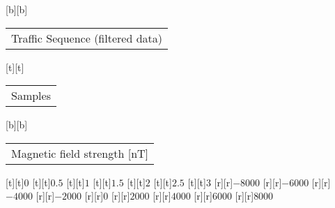 %
%
[b][b]{\fontsize{8}{12}\selectfont \setlength{\tabcolsep}{0pt}\begin{tabular}{c}Traffic Sequence (filtered data)\end{tabular}}%
[t][t]{\fontsize{8}{12}\selectfont \setlength{\tabcolsep}{0pt}\begin{tabular}{c}Samples\end{tabular}}%
[b][b]{\fontsize{8}{12}\selectfont \setlength{\tabcolsep}{0pt}\begin{tabular}{c}Magnetic field strength [nT]\end{tabular}}%
%
\fontsize{6}{8}%
\selectfont%
%
[t][t]{$0$}%
[t][t]{$0.5$}%
[t][t]{$1$}%
[t][t]{$1.5$}%
[t][t]{$2$}%
[t][t]{$2.5$}%
[t][t]{$3$}%
%
[r][r]{$-8000$}%
[r][r]{$-6000$}%
[r][r]{$-4000$}%
[r][r]{$-2000$}%
[r][r]{$0$}%
[r][r]{$2000$}%
[r][r]{$4000$}%
[r][r]{$6000$}%
[r][r]{$8000$}%
%
%
